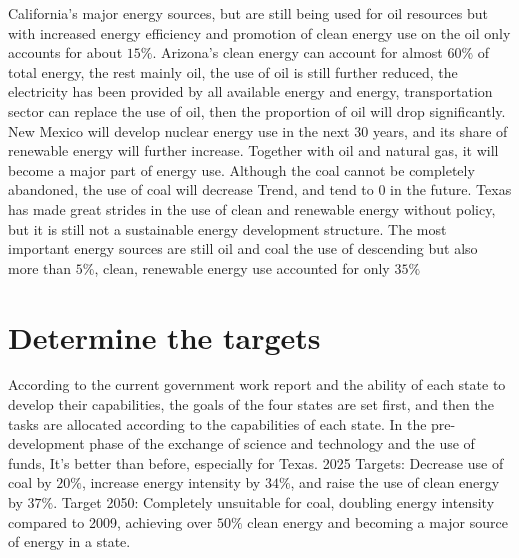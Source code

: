 \documentclass{mcmthesis}
\begin{document}
\begin{itemize}
  California's major energy sources, but are still being used for oil resources but with increased energy efficiency and promotion of
  clean energy use on the oil only accounts for about $15\%$. Arizona's clean energy can account for almost $60\%$ of total energy,
  the rest mainly oil, the use of oil is still further reduced, the electricity has been provided by all available energy and energy,
  transportation sector can replace the use of oil, then the proportion of oil will drop significantly.
  New Mexico will develop nuclear energy use in the next 30 years, and its share of renewable energy will further increase.
  Together with oil and natural gas, it will become a major part of energy use. Although the coal cannot be completely abandoned,
  the use of coal will decrease Trend, and tend to 0 in the future.
  Texas has made great strides in the use of clean and renewable energy without policy,
  but it is still not a sustainable energy development structure.
  The most important energy sources are still oil and coal the use of descending but also more than $5\%$, clean, renewable energy use accounted for only $35\%$
\end{itemize}


\section{Determine the targets}
According to the current government work report and the ability of each state to develop their capabilities,
the goals of the four states are set first, and then the tasks are allocated according to the capabilities of each state.
In the pre-development phase of the exchange of science and technology and the use of funds, It's better than before, especially for Texas.
2025 Targets: Decrease use of coal by $20\%$, increase energy intensity by $34\%$, and raise the use of clean energy by $37\%$.
Target 2050: Completely unsuitable for coal, doubling energy intensity compared to 2009,
achieving over $50\%$ clean energy and becoming a major source of energy in a state.
\end{document}
